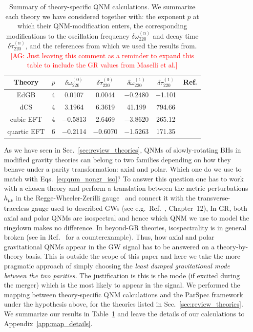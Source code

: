 \documentclass[twocolumn,
               prd,
               aps,
               superscriptaddress,
               tightenlines,
               nofootinbib,
               eqsecnum,
               amsfonts,
               amsmath,
               longbibliography]{revtex4-1}
\newcommand{\agcomm}[1]{{\textcolor{red}{{[AG: #1]}} }}
\begin{document}
\begin{table}[t]
\begin{tabular}{c | c c c c c c}
\hline
\hline
Theory & $p$ & $\delta \omega^{(0)}_{220}$ & $\delta \tau^{(0)}_{220}$ & $\delta \omega^{(1)}_{220}$ & $\delta \tau^{(1)}_{220}$ & Ref.  \\
\hline
EdGB        & 4 & 0.0107    & 0.0044    & $-$0.2480 & $-$1.101 &  \cite{Blazquez-Salcedo:2016enn,Pierini:2021jxd} \\
dCS         & 4 & 3.1964    & 6.3619    & 41.199    & 794.66   &  \cite{Wagle:2021tam}  \\
cubic EFT   & 4 & $-$0.5813 & 2.6469    & $-$3.8620 & 265.12   & \cite{Cano:2021myl} \\
quartic EFT & 6 & $-$0.2114 & $-$0.6070 & $-$1.5263 & 171.35   & \cite{Cano:2021myl}  \\
\hline
\hline
\end{tabular}
\caption{Summary of theory-specific QNM calculations.
%
We summarize each theory we have considered together with: the exponent $p$ at
which their QNM-modification enters, the corresponding modifications to the
oscillation frequency $\delta \omega^{(n)}_{220}$ and decay time $\delta \tau^{(n)}_{220}$, and the
references from which we used the results from.\agcomm{Just leaving this comment 
as a reminder to expand this table to include the GR values from Maselli et al.}
}
\label{tab:ref_theories_qnms}
\end{table}

As we have seen in Sec.~\ref{sec:review_theories}, QNMs of slowly-rotating
BHs in modified gravity theories can belong to two families depending on how 
they behave under a parity transformation: axial and polar. Which one do
we use to match with Eqs.~\eqref{eq:qnm_nongr_iso}?
%
To answer this question one has to work with a chosen theory and perform a
translation between the metric perturbations $h_{\mu\nu}$ in the
Regge-Wheeler-Zerilli gauge~\cite{Regge:1957td,Zerilli:1970se} and connect it with the transverse-traceless gauge
used to described GWs (see e.g.~Ref.~\cite{Maggiore:2018sht}, Chapter~12),
%
In GR, both axial and polar QNMs are isospectral and hence which QNM we use to
model the ringdown makes no difference.
%
In beyond-GR theories, isospectrality is in general broken (see
in Ref.~\cite{Hui:2021cpm} for a counterexample).
%
Thus, how axial and polar gravitational QNMs appear in the GW signal has to be
answered on a theory-by-theory basis.
%
This is outside the scope of this paper and here we take the more pragmatic
approach of simply choosing the \emph{least damped gravitational mode between
the two parities.}
%
The justification is this is the mode (if excited during the merger) which is
the most likely to appear in the signal.
We performed the mapping between theory-specific QNM calculations and the ParSpec framework
under the hypothesis above, for the theories listed in Sec.~\ref{sec:review_theories}.
%
We summarize our results in Table~\ref{tab:ref_theories_qnms} and
leave the details of our calculations to Appendix~\ref{app:map_details}.
\end{document}
